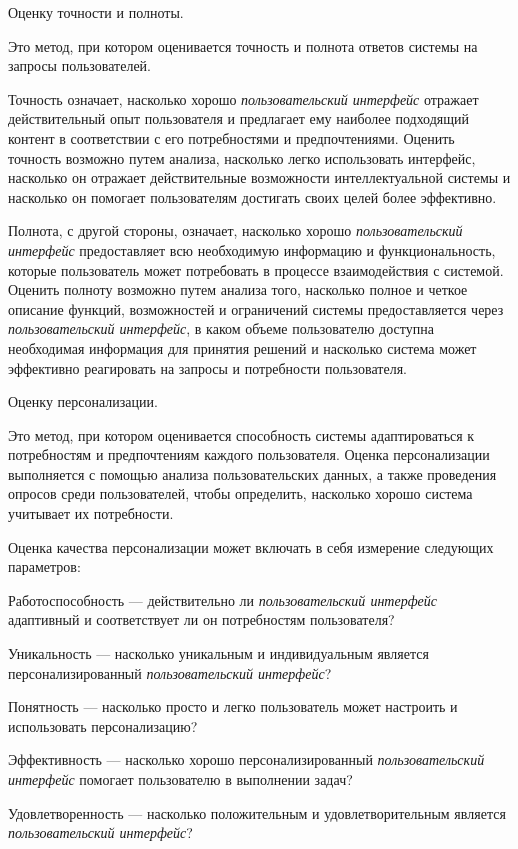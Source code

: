 \begin{textitemize}
	\item Оценку точности и полноты. 
	
	Это метод, при котором оценивается точность и полнота ответов системы на запросы пользователей.
	
	Точность означает, насколько хорошо \textit{пользовательский интерфейс} отражает действительный опыт пользователя и предлагает ему наиболее подходящий контент в соответствии с его потребностями и предпочтениями. Оценить точность возможно путем анализа, насколько легко использовать интерфейс, насколько он отражает действительные возможности интеллектуальной системы и насколько он помогает пользователям достигать своих целей более эффективно.
	
	Полнота, с другой стороны, означает, насколько хорошо \textit{пользовательский интерфейс} предоставляет всю необходимую информацию и функциональность, которые пользователь может потребовать в процессе взаимодействия с системой. Оценить полноту возможно путем анализа того, насколько полное и четкое описание функций, возможностей и ограничений системы предоставляется через \textit{пользовательский интерфейс}, в каком объеме пользователю доступна необходимая информация для принятия решений и насколько система может эффективно реагировать на запросы и потребности пользователя.
	
	\item Оценку персонализации. 
	
	Это метод, при котором оценивается способность системы адаптироваться к потребностям и предпочтениям каждого пользователя. Оценка персонализации выполняется с помощью анализа пользовательских данных, а также проведения опросов среди пользователей, чтобы определить, насколько хорошо система учитывает их потребности.
	
	Оценка качества персонализации может включать в себя измерение следующих параметров:
	\begin{textitemize}
	\item Работоспособность --- действительно ли \textit{пользовательский интерфейс} адаптивный и соответствует ли он потребностям пользователя?
	\item Уникальность --- насколько уникальным и индивидуальным является персонализированный \textit{пользовательский интерфейс}?
	\item Понятность --- насколько просто и легко пользователь может настроить и использовать персонализацию?
	\item Эффективность --- насколько хорошо персонализированный \textit{пользовательский интерфейс} помогает пользователю в выполнении задач?
	\item Удовлетворенность --- насколько положительным и удовлетворительным является \textit{пользовательский интерфейс}?
	\end{textitemize}


\end{textitemize}
